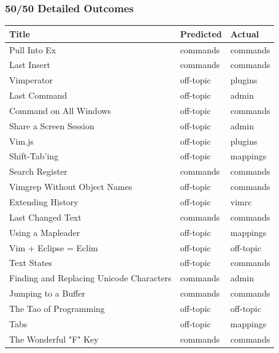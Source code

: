 \documentclass[12pt, a4paper]{article}
\begin{document}
\subsubsection{50/50 Detailed Outcomes}
\begin{longtable}{lll}
\hline
 Title                                       & Predicted   & Actual    \\
\hline
 Pull Into Ex                                & commands    & commands  \\
 Last Insert                                 & commands    & commands  \\
 Vimperator                                  & off-topic   & plugins   \\
 Last Command                                & off-topic   & admin     \\
 Command on All Windows                      & off-topic   & commands  \\
 Share a Screen Session                      & off-topic   & admin     \\
 Vim.js                                      & off-topic   & plugins   \\
 Shift-Tab'ing                               & off-topic   & mappings  \\
 Search Register                             & commands    & commands  \\
 Vimgrep Without Object Names                & off-topic   & commands  \\
 Extending History                           & off-topic   & vimrc     \\
 Last Changed Text                           & commands    & commands  \\
 Using a Mapleader                           & off-topic   & mappings  \\
 Vim + Eclipse = Eclim                       & off-topic   & off-topic \\
 Text States                                 & off-topic   & commands  \\
 Finding and Replacing Unicode Characters    & commands    & admin     \\
 Jumping to a Buffer                         & commands    & commands  \\
 The Tao of Programming                      & off-topic   & off-topic \\
 Tabs                                        & off-topic   & mappings  \\
 The Wonderful "F" Key                       & commands    & commands  \\

\end{longtable}
\end{document}

